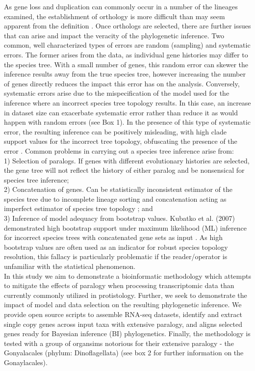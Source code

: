 \documentclass[12pt]{article}
\begin{document}
As gene loss and duplication can commonly occur in a number of the lineages examined, the establishment of orthology is more difficult than may seem apparent from the definition \cite{gabaldon2008large}. 
Once orthologs are selected, there are further issues that can arise and impact the veracity of the phylogenetic inference. 
Two common, well characterized types of errors are random (sampling) and systematic errors. 
The former arises from the data, as individual gene histories may differ to the species tree. 
With a small number of genes, this random error can skewer the inference results away from the true species tree, however increasing the number of genes directly reduces the impact this error has on the analysis. 
Conversely, systematic errors arise due to the mispecification of the model used for the inference where an incorrect species tree topology results. 
In this case, an increase in dataset size can exacerbate systematic error rather than reduce it as would happen with random errors (see Box 1). 
In the presence of this type of systematic error, the resulting inference can be positively misleading,
 with high clade support values for the incorrect tree topology, obfuscating the presence of the error \cite{jeffroy2006phylogenomics,roch2015likelihood,kubatko2007inconsistency}. 
Common problems in carrying out a species tree inference arise from:\\
1) Selection of paralogs. 
If genes with different evolutionary histories are selected, the gene tree will not reflect the history of either paralog and be nonsensical for species tree inference; \\
2) Concatenation of genes. 
Can be statistically inconsistent estimator of the species tree due to incomplete lineage sorting and concatenation acting as imperfect estimator of species tree topology \cite{roch2015likelihood}; and \\
3) Inference of model adequacy from bootstrap values. 
Kubatko et al. (2007) demonstrated high bootstrap support under maximum likelihood (ML) inference for incorrect species trees with concatenated gene sets as input \cite{kubatko2007inconsistency}. 
As high bootstrap values are often used as an indicator for robust species topology resolution, this fallacy is particularly problematic if the reader/operator is unfamiliar with the statistical phenomenon.\\
In this study we aim to demonstrate a bioinformatic methodology which attempts to mitigate the effects of paralogy when processing transcriptomic data than currently commonly utilized in protistology. 
Further, we seek to demonstrate the impact of model and data selection on the resulting phylogenetic inference. 
We provide open source scripts to assemble RNA-seq datasets, identify and extract single copy genes across input taxa with extensive paralogy, and aligns selected genes ready for Bayesian inference (BI) phylogenetics. 
Finally, the methodology is tested with a group of organsims notorious for their extensive paralogy - the Gonyalacales (phylum: Dinoflagellata) (see box 2 for further information on the Gonaylacales).
\end{document}
